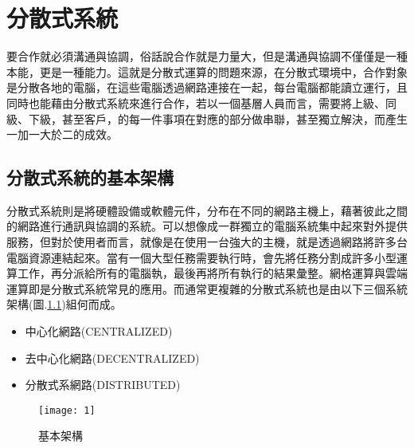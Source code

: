 \chapter{分散式系統}
\renewcommand{\baselinestretch}{10} %
\par
\renewcommand{\baselinestretch}{1} %
\twelve \qquad 要合作就必須溝通與協調，俗話說合作就是力量大，但是溝通與協調不僅僅是一種本能，更是一種能力。這就是分散式運算的問題來源，在分散式環境中，合作對象是分散各地的電腦，在這些電腦透過網路連接在一起，每台電腦都能讀立運行，且同時也能藉由分散式系統來進行合作，若以一個基層人員而言，需要將上級、同級、下級，甚至客戶，的每一件事項在對應的部分做串聯，甚至獨立解決，而產生一加一大於二的成效。
\par

\renewcommand{\baselinestretch}{20} %
\section{分散式系統的基本架構}
\par
\renewcommand{\baselinestretch}{1} %
\twelve \qquad 分散式系統則是將硬體設備或軟體元件，分布在不同的網路主機上，藉著彼此之間的網路進行通訊與協調的系統。可以想像成一群獨立的電腦系統集中起來對外提供服務，但對於使用者而言，就像是在使用一台強大的主機，就是透過網路將許多台電腦資源連結起來。當有一個大型任務需要執行時，會先將任務分割成許多小型運算工作，再分派給所有的電腦執，最後再將所有執行的結果彙整。網格運算與雲端運算即是分散式系統常見的應用。而通常更複雜的分散式系統也是由以下三個系統架構(圖.\ref{fig.基本架構})組何而成。
\\
\begin{itemize}
	\item 中心化網路(CENTRALIZED)
	\item 去中心化網路(DECENTRALIZED)
	\item 分散式系網路(DISTRIBUTED)
\end{itemize}
\par

\clearpage%
\renewcommand{\baselinestretch}{2} %
\begin{figure}[hbt!]
\begin{center}
\texttt{[image: 1]}
\caption{\large 基本架構}\label{fig.基本架構}
\end{center}
\end{figure}
\par

